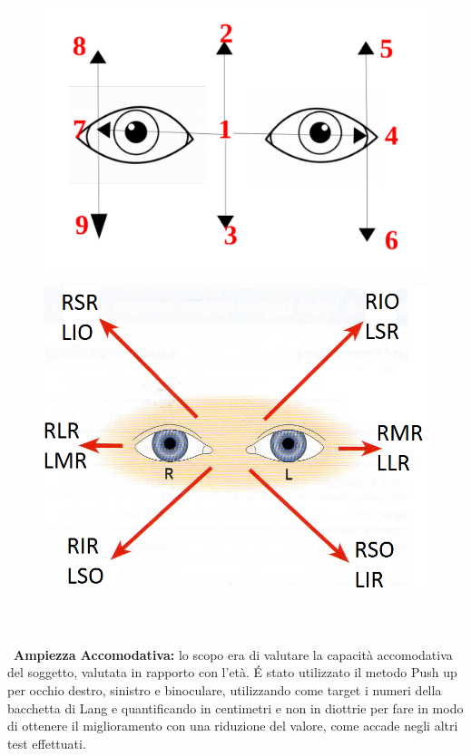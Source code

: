 \begin{figure}[H]
\centering
\begin{minipage}{.5\textwidth}
  \centering
  \includegraphics[scale=0.3]{source/immagini/posizioni_cover_test.png}
  \label{fig:test1}
\end{minipage}%
\begin{minipage}{.5\textwidth}
  \centering
  \includegraphics[scale=0.39]{source/immagini/posizioni_di_sguardo.png}
  \label{fig:test2}
\end{minipage}
\end{figure}
\\\ \\\
\textbf{Ampiezza Accomodativa:} lo scopo era di valutare la capacità accomodativa del soggetto, valutata in rapporto con l’età. É stato
utilizzato il metodo Push up per occhio destro, sinistro e binoculare, utilizzando come target i numeri della bacchetta di
Lang e quantificando in centimetri e non in diottrie per fare in modo di ottenere il miglioramento con una riduzione del valore, come accade negli altri test effettuati.

